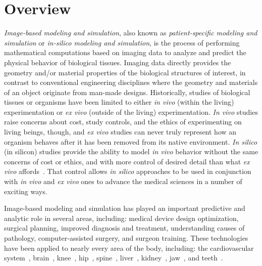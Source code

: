 \chapter{Overview}
\textit{Image-based modeling and simulation}, also known as \textit{patient-specific modeling and simulation} or \textit{in-silico modeling and simulation}, is the process of performing mathematical computations based on imaging data to analyze and predict the physical behavior of biological tissues. Imaging data directly provides the geometry and/or material properties of the biological structures of interest, in contrast to conventional engineering disciplines where the geometry and materials of an object originate from man-made designs. Historically, studies of biological tissues or organisms have been limited to either \textit{in vivo} (within the living) experimentation or \textit{ex vivo} (outside of the living) experimentation. \textit{In vivo} studies raise concerns about cost, study controls, and the ethics of experimenting on living beings, though, and \textit{ex vivo} studies can never truly represent how an organism behaves after it has been removed from its native environment. \textit{In silico} (in silicon) studies provide the ability to model \textit{in vivo} behavior without the same concerns of cost or ethics, and with more control of desired detail than what \textit{ex vivo} affords~\cite{colquitt_2011}. That control allows \textit{in silico} approaches to be used in conjunction with \textit{in vivo} and \textit{ex vivo} ones to advance the medical sciences in a number of exciting ways.


Image-based modeling and simulation has played an important predictive and analytic role in several areas, including:  medical device design optimization,  surgical planning, improved diagnosis and treatment, understanding causes of pathology, computer-assisted surgery, and surgeon training. These technologies have been applied to nearly every area of the body, including: the cardiovascular system~\cite{min_2015, updegrove_2016}, brain~\cite{weickenmeier_2016, behnia_2008}, knee~\cite{erdemir_2015, donahue_2002}, hip~\cite{anderson_2008, el'sheikh_2003}, spine~\cite{malandrino_2014, dumas_2005}, liver~\cite{shi_2008, schwen_2014}, kidney~\cite{eloot_2002, snedeker_2005}, jaw~\cite{idrus_2017, narra_2014}, and teeth~\cite{frisardi_2011, geng_2001}. 

